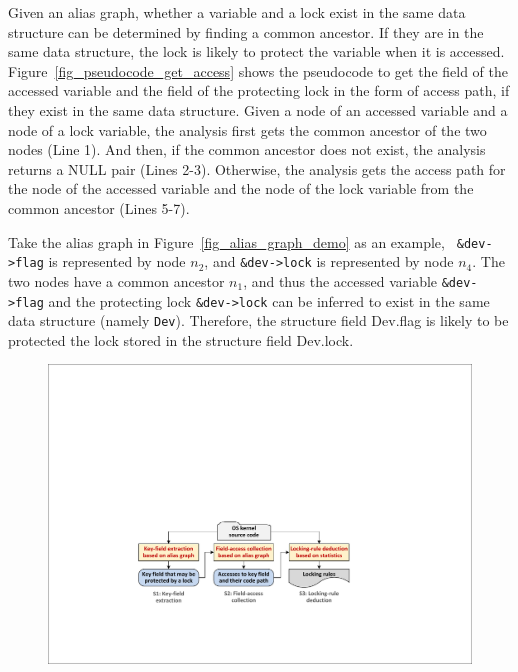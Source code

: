 Given an alias graph, whether a variable and a lock exist in the same data 
structure can be determined by finding a common ancestor. If they are in the 
same data structure, the lock is likely to protect the variable when it is 
accessed. Figure~\ref{fig_pseudocode_get_access} shows the pseudocode to 
get the field of the accessed variable and the field of the protecting lock in 
the form of access path, if they exist in the same data structure. Given a node 
of an accessed variable and a node of a lock variable, the analysis first gets 
the common ancestor of the two nodes (Line 1). And then, if the common ancestor 
does not exist, the analysis returns a NULL pair (Lines 2-3). Otherwise, the 
analysis gets the access path for the node of the accessed variable and the 
node of the lock variable from the common ancestor (Lines 5-7).

Take the alias graph in Figure~\ref{fig_alias_graph_demo} as an example, {\tt 
\&dev->flag} is represented by node $\mathit{n_2}$, and {\tt \&dev->lock} is 
represented by node $\mathit{n_4}$. The two nodes have a common ancestor 
$\mathit{n_1}$, and thus the accessed variable {\tt \&dev->flag} and the 
protecting lock {\tt \&dev->lock} can be inferred to exist in the same data 
structure (namely {\tt Dev}). Therefore, the structure field Dev.flag is likely 
to be protected the lock stored in the structure field Dev.lock.

\begin{figure}[htbp]
	\centering
	\includegraphics[width=1\linewidth]{figures/fig_workflow.pdf}
	\label{fig_workflow}
\end{figure}


